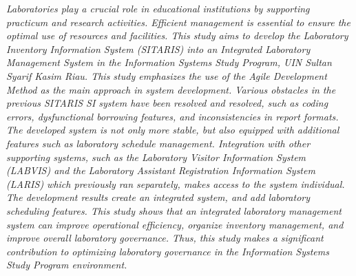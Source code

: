 \noindent
\fontsize{10pt}{12pt}\selectfont
\emph{Laboratories play a crucial role in educational institutions by supporting practicum and research activities. Efficient management is essential to ensure the optimal use of resources and facilities. This study aims to develop the Laboratory Inventory Information System (SITARIS) into an Integrated Laboratory Management System in the Information Systems Study Program, UIN Sultan Syarif Kasim Riau. This study emphasizes the use of the Agile Development Method as the main approach in system development. Various obstacles in the previous SITARIS SI system have been resolved and resolved, such as coding errors, dysfunctional borrowing features, and inconsistencies in report formats. The developed system is not only more stable, but also equipped with additional features such as laboratory schedule management. Integration with other supporting systems, such as the Laboratory Visitor Information System (LABVIS) and the Laboratory Assistant Registration Information System (LARIS) which previously ran separately, makes access to the system individual. The development results create an integrated system, and add laboratory scheduling features. This study shows that an integrated laboratory management system can improve operational efficiency, organize inventory management, and improve overall laboratory governance. Thus, this study makes a significant contribution to optimizing laboratory governance in the Information Systems Study Program environment.}\\
 \\